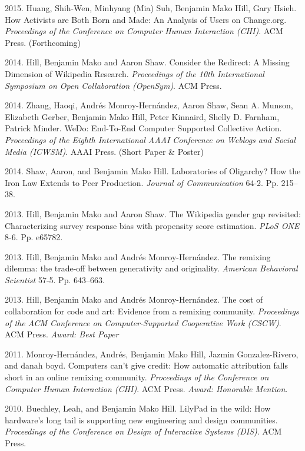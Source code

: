 \documentclass[10pt]{article}
\newenvironment{cvlist}{
\begin{list}{}{\leftmargin=3.0em \itemindent=-3.0em}
  \setlength{\itemsep}{0pt}
  \setlength{\parskip}{0em}
  \setlength{\parsep}{1em}
  \setlength{\parindent}{0em}}
{\vspace{1em}
\end{list}}
\begin{document}
\begin{cvlist}
\item 2015. Huang, Shih-Wen, Minhyang (Mia) Suh, Benjamin Mako Hill, Gary Hsieh. How Activists are Both Born and Made: An Analysis of Users on Change.org. \emph{Proceedings of the Conference on Computer Human Interaction (CHI)}. ACM Press. (Forthcoming) %
\item 2014. Hill, Benjamin Mako and Aaron Shaw. Consider the Redirect: A Missing Dimension of Wikipedia Research. \emph{Proceedings of the 10th International Symposium on Open Collaboration (OpenSym)}. ACM Press.
\item 2014. Zhang, Haoqi, Andrés Monroy-Hernández, Aaron Shaw, Sean A. Munson, Elizabeth Gerber, Benjamin Mako Hill, Peter Kinnaird, Shelly D. Farnham, Patrick Minder. WeDo: End-To-End Computer Supported Collective Action. \emph{Proceedings of the Eighth International AAAI Conference on Weblogs and Social Media (ICWSM)}. AAAI Press. (Short Paper \& Poster)
\item 2014. Shaw, Aaron, and Benjamin Mako Hill. Laboratories of Oligarchy? How the Iron Law Extends to Peer Production. \emph{Journal of Communication} 64-2. Pp. 215–38.
\item 2013. Hill, Benjamin Mako and Aaron Shaw. The Wikipedia gender gap revisited: Characterizing survey response bias with propensity score estimation. \emph{PLoS ONE} 8-6. Pp. e65782.
\item 2013. Hill, Benjamin Mako and Andrés Monroy-Hernández. The remixing dilemma: the trade-off between generativity and originality. \emph{American Behavioral Scientist} 57-5. Pp. 643--663.
\item 2013. Hill, Benjamin Mako and Andrés Monroy-Hernández. The cost of collaboration for code and art: Evidence from a remixing community. \emph{Proceedings of the ACM Conference on Computer-Supported Cooperative Work (CSCW)}. ACM Press. \emph{Award: Best Paper}
\item 2011. Monroy-Hernández, Andrés, Benjamin Mako Hill, Jazmin Gonzalez-Rivero, and danah boyd. Computers can't give credit: How automatic attribution falls short in an online remixing community. \emph{Proceedings of the Conference on Computer Human Interaction (CHI)}. ACM Press. \emph{Award: Honorable Mention}.
\item 2010. Buechley, Leah, and Benjamin Mako Hill. LilyPad in the wild: How hardware's long tail is supporting new engineering and design communities. \emph{Proceedings of the Conference on Design of Interactive Systems (DIS)}. ACM Press.

\end{cvlist}
\end{document}
